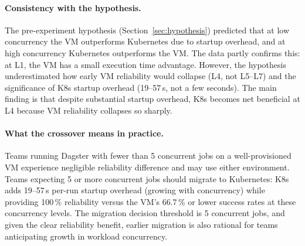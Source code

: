 \paragraph{Consistency with the hypothesis.}
The pre-experiment hypothesis (Section~\ref{sec:hypothesis}) predicted that at low concurrency the VM outperforms Kubernetes due to startup overhead, and at high concurrency Kubernetes outperforms the VM.
The data partly confirms this: at L1, the VM has a small execution time advantage.
However, the hypothesis underestimated how early VM reliability would collapse (L4, not L5--L7) and the significance of K8s startup overhead (19--57\,s, not a few seconds).
The main finding is that despite substantial startup overhead, K8s becomes net beneficial at L4 because VM reliability collapses so sharply.

\paragraph{What the crossover means in practice.}
Teams running Dagster with fewer than 5 concurrent jobs on a well-provisioned VM experience negligible reliability difference and may use either environment.
Teams expecting 5 or more concurrent jobs should migrate to Kubernetes: K8s adds 19--57\,s per-run startup overhead (growing with concurrency) while providing 100\,\% reliability versus the VM's 66.7\,\% or lower success rates at these concurrency levels.
The migration decision threshold is 5 concurrent jobs, and given the clear reliability benefit, earlier migration is also rational for teams anticipating growth in workload concurrency.

